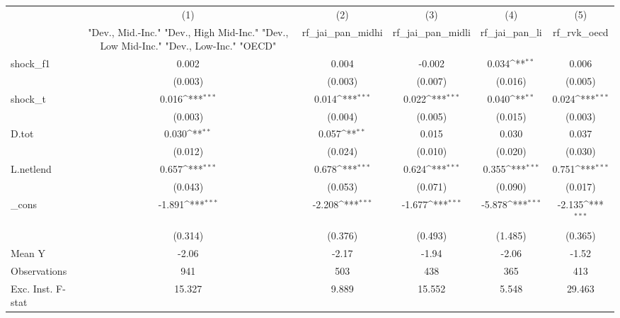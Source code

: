 {
\def\sym#1{\ifmmode^{#1}\else\(^{#1}\)\fi}
\begin{tabular}{l*{5}{c}}
\toprule
            &\multicolumn{1}{c}{(1)}&\multicolumn{1}{c}{(2)}&\multicolumn{1}{c}{(3)}&\multicolumn{1}{c}{(4)}&\multicolumn{1}{c}{(5)}\\
            &\multicolumn{1}{c}{ "Dev., Mid.-Inc." "Dev., High Mid-Inc." "Dev., Low Mid-Inc." "Dev., Low-Inc." "OECD" }&\multicolumn{1}{c}{rf\_jai\_pan\_midhi}&\multicolumn{1}{c}{rf\_jai\_pan\_midli}&\multicolumn{1}{c}{rf\_jai\_pan\_li}&\multicolumn{1}{c}{rf\_rvk\_oecd}\\
\midrule
shock\_f1    &       0.002         &       0.004         &      -0.002         &       0.034\sym{**} &       0.006         \\
            &     (0.003)         &     (0.003)         &     (0.007)         &     (0.016)         &     (0.005)         \\
\addlinespace
shock\_t     &       0.016\sym{***}&       0.014\sym{***}&       0.022\sym{***}&       0.040\sym{**} &       0.024\sym{***}\\
            &     (0.003)         &     (0.004)         &     (0.005)         &     (0.015)         &     (0.003)         \\
\addlinespace
D.tot       &       0.030\sym{**} &       0.057\sym{**} &       0.015         &       0.030         &       0.037         \\
            &     (0.012)         &     (0.024)         &     (0.010)         &     (0.020)         &     (0.030)         \\
\addlinespace
L.netlend   &       0.657\sym{***}&       0.678\sym{***}&       0.624\sym{***}&       0.355\sym{***}&       0.751\sym{***}\\
            &     (0.043)         &     (0.053)         &     (0.071)         &     (0.090)         &     (0.017)         \\
\addlinespace
\_cons      &      -1.891\sym{***}&      -2.208\sym{***}&      -1.677\sym{***}&      -5.878\sym{***}&      -2.135\sym{***}\\
            &     (0.314)         &     (0.376)         &     (0.493)         &     (1.485)         &     (0.365)         \\
\midrule
Mean Y      &       -2.06         &       -2.17         &       -1.94         &       -2.06         &       -1.52         \\
Observations&         941         &         503         &         438         &         365         &         413         \\
Exc. Inst. F-stat&      15.327         &       9.889         &      15.552         &       5.548         &      29.463         \\
\bottomrule
\end{tabular}
}
